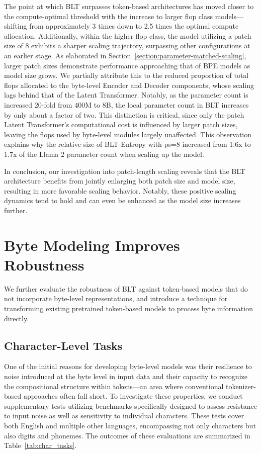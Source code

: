 The point at which {\textsc BLT} surpasses token-based architectures has moved closer to the compute-optimal threshold with the increase to larger flop class models—shifting from approximately 3 times down to 2.5 times the optimal compute allocation. Additionally, within the higher flop class, the model utilizing a patch size of 8 exhibits a sharper scaling trajectory, surpassing other configurations at an earlier stage. As elaborated in Section~\ref{section:parameter-matched-scaling}, larger patch sizes demonstrate performance approaching that of BPE models as model size grows. We partially attribute this to the reduced proportion of total flops allocated to the byte-level Encoder and Decoder components, whose scaling lags behind that of the Latent Transformer. Notably, as the parameter count is increased 20-fold from 400M to 8B, the local parameter count in {\textsc BLT} increases by only about a factor of two. This distinction is critical, since only the patch Latent Transformer’s computational cost is influenced by larger patch sizes, leaving the flops used by byte-level modules largely unaffected. This observation explains why the relative size of {\textsc BLT}-Entropy with ps=8 increased from 1.6x to 1.7x of the Llama 2 parameter count when scaling up the model.

In conclusion, our investigation into patch-length scaling reveals that the {\textsc BLT} architecture benefits from jointly enlarging both patch size and model size, resulting in more favorable scaling behavior. Notably, these positive scaling dynamics tend to hold and can even be enhanced as the model size increases further.

\section{Byte Modeling Improves Robustness} We further evaluate the robustness of {\textsc BLT} against token-based models that do not incorporate byte-level representations, and introduce a technique for transforming existing pretrained token-based models to process byte information directly.
\label{sec:robustness}

\subsection{Character-Level Tasks}

One of the initial reasons for developing byte-level models was their resilience to noise introduced at the byte level in input data and their capacity to recognize the compositional structure within tokens—an area where conventional tokenizer-based approaches often fall short. To investigate these properties, we conduct supplementary tests utilizing benchmarks specifically designed to assess resistance to input noise as well as sensitivity to individual characters. These tests cover both English and multiple other languages, encompassing not only characters but also digits and phonemes. The outcomes of these evaluations are summarized in Table~\ref{tab:char_tasks}.


